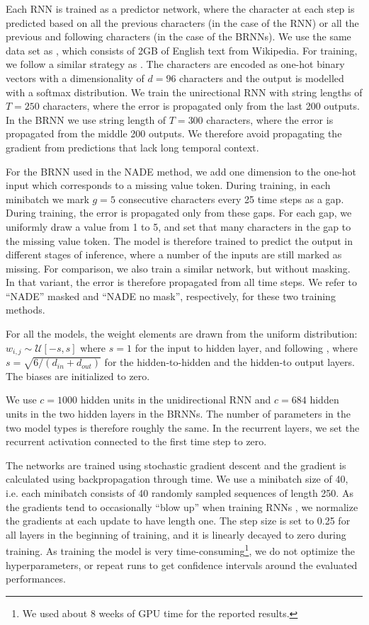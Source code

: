 \documentclass{article}
\begin{document}
Each RNN is trained as a predictor network, where the character at each 
step is predicted based on all the previous characters (in the case of the 
RNN) or all the previous and following characters (in the case 
of the BRNNs). We use the same data set as \citet{sutskever2011generating}, which consists of 2GB of English text from Wikipedia. For training, we follow
a similar strategy as \citet{NIPS2013_5166}.
The characters are encoded as one-hot binary vectors with a dimensionality of $d=96$ characters and the output is modelled 
with a softmax distribution. We 
train the unirectional RNN with string lengths of $T=250$ characters, where the 
error is propagated only from the last 200 outputs. In the BRNN we 
use string length of $T=300$ characters, where the error is propagated from the 
middle 200 outputs. We therefore avoid propagating the gradient from predictions 
that lack long temporal context.

For the BRNN used in the NADE method, we add one dimension to the one-hot input 
which corresponds to a missing value token. During training, in each minibatch 
we mark $g=5$ consecutive characters every 25 time steps as a gap. During 
training, the error is propagated only from these gaps. For each gap, we 
uniformly draw a value from 1 to 5, and set that many characters in the gap to the missing value token. The model is therefore trained to 
predict the output in different stages of inference, where a number of the 
inputs are still marked as missing. For comparison, we also train a similar network,
but without masking. In that variant, the error is therefore propagated from all time steps.
We refer to ``NADE'' masked and ``NADE no mask'', respectively, for these two training methods.

For all the models, the weight elements are drawn from the uniform 
distribution: $w_{i,j}\sim \mathcal{U}\left[-s, s\right]$ where $s=1$ for the 
input to hidden layer, and following \citet{glorot2010understanding}, where $s=\sqrt{6/\left(d_{in} + d_{out}\right)}$ for the 
hidden-to-hidden and the hidden-to output layers. The biases are initialized to 
zero.

We use $c=1000$ hidden units in the unidirectional RNN and $c=684$ hidden units in the 
two hidden layers in the BRNNs. The number of parameters in the two model types 
is therefore roughly the same. In the recurrent layers, we set the recurrent activation connected to the first time step to zero.

The networks are trained using stochastic gradient descent and the gradient is 
calculated using backpropagation through time. We use a minibatch size of 40, 
i.e. each minibatch consists of 40 randomly sampled sequences of length 250. As 
the gradients tend to occasionally ``blow up'' when training RNNs 
\citep{bengio1994learning,pascanu2013difficulty}, we normalize the gradients at 
each update to have length one. The step size is set to 0.25 for all layers in 
the beginning of training, and it is linearly decayed to zero during training. 
As training the model is very time-consuming\footnote{We used about 8 weeks of GPU time for the reported results.}, we do not optimize the 
hyperparameters, or repeat runs to get confidence intervals around the 
evaluated performances.
\end{document}
